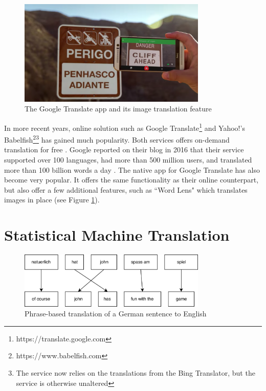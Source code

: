 \begin{figure}[H]
    \centering
    \includegraphics[width=0.8\textwidth]{fig/background_theory/google_translate_rt.png}
    \caption{The Google Translate app and its image translation feature}
    \label{fig:google-translate-rt}
\end{figure}

In more recent years, online solution such as Google Translate\footnote{https://translate.google.com} and Yahoo!'s Babelfish\footnote{https://www.babelfish.com}\footnote{The service now relies on the translations from the Bing Translator, but the service is otherwise unaltered} has gained much popularity. Both services offers on-demand translation for free \citep{schuster2016googletranslate, hutchins2007machine}. Google reported on their blog in 2016 that their service supported over 100 languages, had more than 500 million users, and translated more than 100 billion words a day \citep{turovsky2016googletranslate}. The native app for Google Translate has also become very popular. It offers the same functionality as their online counterpart, but also offer a few additional features, such as ``Word Lens" which translates images in place (see Figure \ref{fig:google-translate-rt}).


\section{Statistical Machine Translation}
\label{sec:statistical_machine_translation}
\begin{figure}[ht]
    \centering
    \includegraphics[width=0.8\textwidth]{fig/related_work/translation.png}
    \caption{Phrase-based translation of a German sentence to English}
    \label{fig:translation-phrase-based}
\end{figure}

